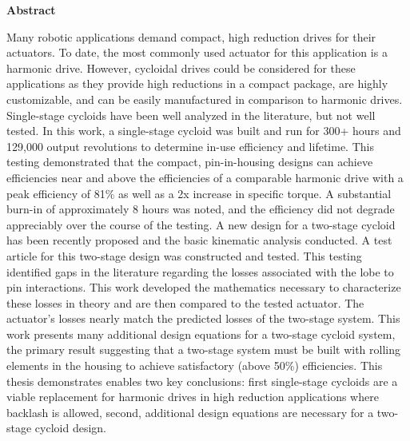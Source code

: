 \begin{center}
\large
\textbf{Abstract}
\end{center}

Many robotic applications demand compact, high reduction drives for their actuators. To date, the most commonly used actuator for this application is a harmonic drive. However, cycloidal drives could be considered for these applications as they provide high reductions in a compact package, are highly customizable, and can be easily manufactured in comparison to harmonic drives. Single-stage cycloids have been well analyzed in the literature, but not well tested. In this work, a single-stage cycloid was built and run for 300+ hours and 129,000 output revolutions to determine in-use efficiency and lifetime. This testing demonstrated that the compact, pin-in-housing designs can achieve efficiencies near and above the efficiencies of a comparable harmonic drive with a peak efficiency of 81\% as well as a 2x increase in specific torque. A substantial burn-in of approximately 8 hours was noted, and the efficiency did not degrade appreciably over the course of the testing. A new design for a two-stage cycloid has been recently proposed and the basic kinematic analysis conducted. A test article for this two-stage design was constructed and tested. This testing identified gaps in the literature regarding the losses associated with the lobe to pin interactions. This work developed the mathematics necessary to characterize these losses in theory and are then compared to the tested actuator. The actuator's losses nearly match the predicted losses of the two-stage system. This work presents many additional design equations for a two-stage cycloid system, the primary result suggesting that a two-stage system must be built with rolling elements in the housing to achieve satisfactory (above 50\%) efficiencies. This thesis demonstrates enables two key conclusions: first single-stage cycloids are a viable replacement for harmonic drives in high reduction applications where backlash is allowed, second, additional design equations are necessary for a two-stage cycloid design.